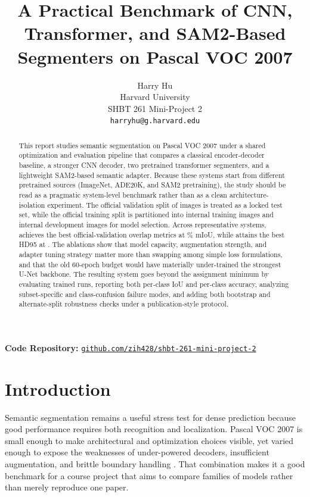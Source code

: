 \documentclass{article}
\title{A Practical Benchmark of CNN, Transformer, and SAM2-Based Segmenters on Pascal VOC 2007}
\author{%
  Harry Hu \\
  Harvard University \\
  SHBT 261 Mini-Project 2 \\
  \texttt{harryhu@g.harvard.edu}
}
\begin{document}
\maketitle

\begin{center}
\small\textbf{Code Repository:} \href{https://github.com/zih428/shbt-261-mini-project-2}{\texttt{github.com/zih428/shbt-261-mini-project-2}}
\end{center}

\begin{abstract}
This report studies semantic segmentation on Pascal VOC 2007 under a shared optimization and evaluation pipeline that compares a classical encoder-decoder baseline, a stronger CNN decoder, two pretrained transformer segmenters, and a lightweight SAM2-based semantic adapter. Because these systems start from different pretrained sources (ImageNet, ADE20K, and SAM2 pretraining), the study should be read as a pragmatic system-level benchmark rather than as a clean architecture-isolation experiment. The official validation split of \OfficialValCount{} images is treated as a locked test set, while the official training split is partitioned into \InternalTrainCount{} internal training images and \InternalDevCount{} internal development images for model selection. Across \HeadlineModelCount{} representative systems, \TopModelName{} achieves the best official-validation overlap metrics at \TopModelMiou{}\% mIoU, while \BestHdModelName{} attains the best HD95 at \BestHdValue{}. The ablations show that model capacity, augmentation strength, and adapter tuning strategy matter more than swapping among simple loss formulations, and that the old 60-epoch budget would have materially under-trained the strongest U-Net backbone. The resulting system goes beyond the assignment minimum by evaluating \CompletedTrainRunCount{} trained runs, reporting both per-class IoU and per-class accuracy, analyzing subset-specific and class-confusion failure modes, and adding both bootstrap and alternate-split robustness checks under a publication-style protocol.
\end{abstract}

\section{Introduction}

Semantic segmentation remains a useful stress test for dense prediction because good performance requires both recognition and localization. Pascal VOC 2007 is small enough to make architectural and optimization choices visible, yet varied enough to expose the weaknesses of under-powered decoders, insufficient augmentation, and brittle boundary handling \citep{everingham2010pascal}. That combination makes it a good benchmark for a course project that aims to compare families of models rather than merely reproduce one paper.
\end{document}

